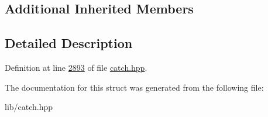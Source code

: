 \subsection*{Additional Inherited Members}


\subsection{Detailed Description}


Definition at line \mbox{\hyperlink{catch_8hpp_source_l02893}{2893}} of file \mbox{\hyperlink{catch_8hpp_source}{catch.\+hpp}}.



The documentation for this struct was generated from the following file\+:\begin{DoxyCompactItemize}
\item 
lib/catch.\+hpp\end{DoxyCompactItemize}
